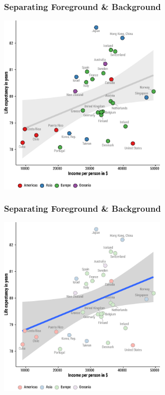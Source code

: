 \documentclass[hyperref={bookmarks=false}]{beamer}
\begin{document}

\begin{frame}
\frametitle{Separating Foreground \& Background}

\center\includegraphics[width = 0.62\textwidth]{./fig/fb1.pdf}


\end{frame}


\begin{frame}
\frametitle{Separating Foreground \& Background}

\center\includegraphics[width = 0.62\textwidth]{./fig/fb2.pdf}


\end{frame}
\end{document}
